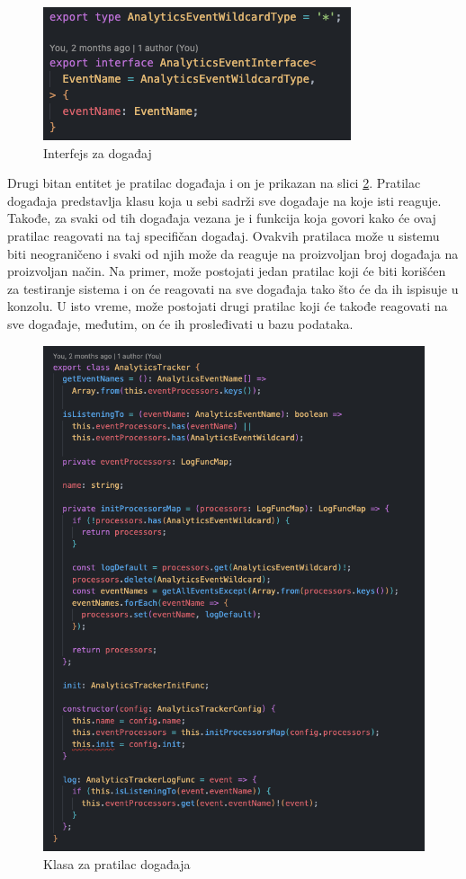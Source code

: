 \documentclass[12pt,oneside]{memoir}
\begin{document}
\begin{figure}[h!]
\centering
\includegraphics[scale=0.5]{docs/images/chapterSix/eventInterface.png}
\caption{Interfejs za događaj}
\label{fig:eventInterface}
\end{figure}

Drugi bitan entitet je pratilac događaja i on je prikazan na slici \ref{fig:analyticsTracker}. Pratilac događaja predstavlja klasu koja u sebi sadrži sve događaje na koje isti reaguje. Takođe, za svaki od tih događaja vezana je i funkcija koja govori kako će ovaj pratilac reagovati na taj specifičan događaj. Ovakvih pratilaca može u sistemu biti neograničeno i svaki od njih može da reaguje na proizvoljan broj događaja na proizvoljan način. Na primer, može postojati jedan pratilac koji će biti korišćen za testiranje sistema i on će reagovati na sve događaja tako što će da ih ispisuje u konzolu. U isto vreme, može postojati drugi pratilac koji će takođe reagovati na sve događaje, međutim, on će ih prosleđivati u bazu podataka.

\begin{figure}[h!]
\centering
\includegraphics[scale=0.5]{docs/images/chapterSix/analyticsTracker.png}
\caption{Klasa za pratilac događaja}
\label{fig:analyticsTracker}
\end{figure}
\end{document}
